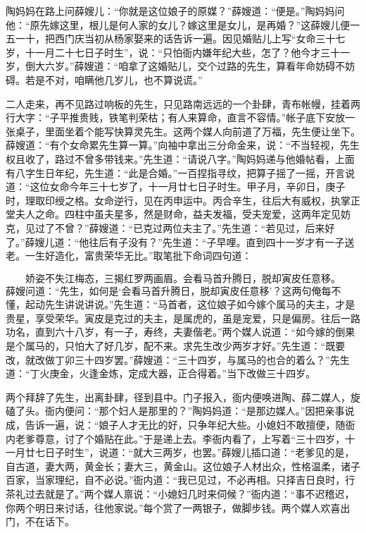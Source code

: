 陶妈妈在路上问薛嫂儿：“你就是这位娘子的原媒？”薛嫂道：“便是。”陶妈妈问他：“原先嫁这里，根儿是何人家的女儿？嫁这里是女儿，是再婚？”这薛嫂儿便一五一十，把西门庆当初从杨家娶来的话告诉一遍。因见婚贴儿上写“女命三十七岁，十一月二十七日子时生”，说：“只怕衙内嫌年纪大些，怎了？他今才三十一岁，倒大六岁。”薛嫂道：“咱拿了这婚贴儿，交个过路的先生，算看年命妨碍不妨碍。若是不对，咱瞒他几岁儿，也不算说谎。”

二人走来，再不见路过响板的先生，只见路南远远的一个卦肆，青布帐幔，挂着两行大字：“子平推贵贱，铁笔判荣枯；有人来算命，直言不容情。”帐子底下安放一张桌子，里面坐着个能写快算灵先生。这两个媒人向前道了万福，先生便让坐下。薛嫂道：“有个女命累先生算一算。”向袖中拿出三分命金来，说：“不当轻视，先生权且收了，路过不曾多带钱来。”先生道：“请说八字。”陶妈妈递与他婚帖看，上面有八字生日年纪，先生道：“此是合婚。”一百捏指寻纹，把算子摇了一摇，开言说道：“这位女命今年三十七岁了，十一月廿七日子时生。甲子月，辛卯日，庚子时，理取印绶之格。女命逆行，见在丙申运中。丙合辛生，往后大有威权，执掌正堂夫人之命。四柱中虽夫星多，然是财命，益夫发福，受夫宠爱，这两年定见妨克，见过了不曾？”薛嫂道：“已克过两位夫主了。”先生道：“若见过，后来好了。”薛嫂儿道：“他往后有子没有？”先生道：“子早哩。直到四十一岁才有一子送老。一生好造化，富贵荣华无比。”取笔批下命词四句道：

\[
娇姿不失江梅态，三揭红罗两画眉。
会看马首升腾日，脱却寅皮任意移。
\]
薛嫂问道：“先生，如何是‘会看马首升腾日，脱却寅皮任意移’？这两句俺每不懂，起动先生讲说讲说。”先生道：“马首者，这位娘子如今嫁个属马的夫主，才是贵星，享受荣华。寅皮是克过的夫主，是属虎的，虽是宠爱，只是偏房。往后一路功名，直到六十八岁，有一子，寿终，夫妻偕老。”两个媒人说道：“如今嫁的倒果是个属马的，只怕大了好几岁，配不来。求先生改少两岁才好。”先生道：“既要改，就改做丁卯三十四岁罢。”薛嫂道：“三十四岁，与属马的也合的着么？”先生道：“丁火庚金，火逢金炼，定成大器，正合得着。”当下改做三十四岁。

两个拜辞了先生，出离卦肆，径到县中。门子报入，衙内便唤进陶、薛二媒人，旋磕了头。衙内便问：“那个妇人是那里的？”陶妈妈道：“是那边媒人。”因把亲事说成，告诉一遍，说：“娘子人才无比的好，只争年纪大些。小媳妇不敢擅便，随衙内老爹尊意，讨了个婚贴在此。”于是递上去。李衙内看了，上写着“三十四岁，十一月廿七日子时生”，说道：“就大三两岁，也罢。”薛嫂儿插口道：“老爹见的是，自古道，妻大两，黄金长；妻大三，黄金山。这位娘子人材出众，性格温柔，诸子百家，当家理纪，自不必说。”衙内道：“我已见过，不必再相。只择吉日良时，行茶礼过去就是了。”两个媒人禀说：“小媳妇几时来伺候？”衙内道：“事不迟稽迟，你两个明日来讨话，往他家说。”每个赏了一两银子，做脚步钱。两个媒人欢喜出门，不在话下。

